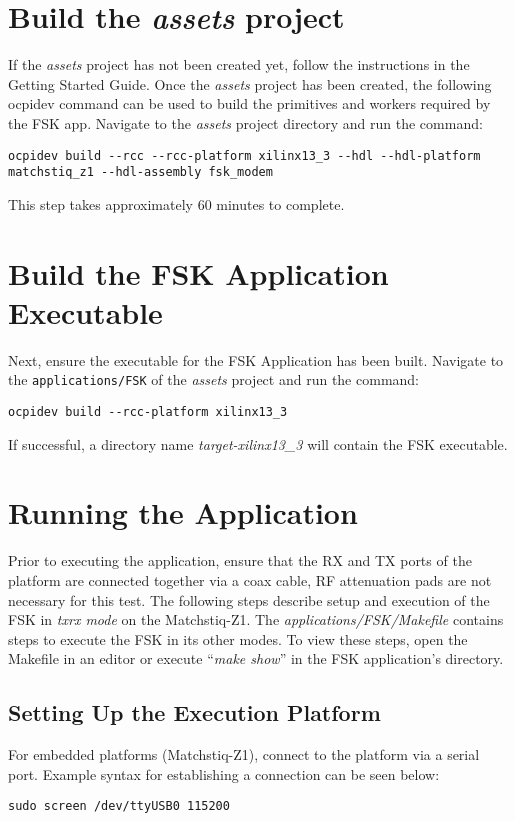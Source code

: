 \begin{flushleft}
\section{Build the \textit{assets} project}
If the \textit{assets} project has not been created yet, follow the instructions in the Getting Started Guide. Once the \textit{assets} project has been created, the following ocpidev command can be used to build the primitives and workers required by the FSK app. Navigate to the \textit{assets} project directory and run the command:
\begin{verbatim}
ocpidev build --rcc --rcc-platform xilinx13_3 --hdl --hdl-platform matchstiq_z1 --hdl-assembly fsk_modem
\end{verbatim}
This step takes approximately 60 minutes to complete.

\section{Build the FSK Application Executable}
Next, ensure the executable for the FSK Application has been built. Navigate to the \texttt{applications/FSK} of the \textit{assets} project and run the command:
\begin{verbatim}
ocpidev build --rcc-platform xilinx13_3
\end{verbatim}
If successful, a directory name \textit{target-xilinx13\_3} will contain the FSK executable.

\section{Running the Application}
Prior to executing the application, ensure that the RX and TX ports of the platform are connected together via a coax cable, RF attenuation pads are not necessary for this test. The following steps describe setup and execution of the FSK in \textit{txrx mode} on the Matchstiq-Z1. The \textit{applications/FSK/Makefile} contains steps to execute the FSK in its other modes. To view these steps, open the Makefile in an editor or execute ``\textit{make show}'' in the FSK application's directory.
\subsection{Setting Up the Execution Platform}
For embedded platforms (Matchstiq-Z1), connect to the platform via a serial port. Example syntax for establishing a connection can be seen below:
\begin{verbatim}
sudo screen /dev/ttyUSB0 115200
\end{verbatim}

\end{flushleft}
